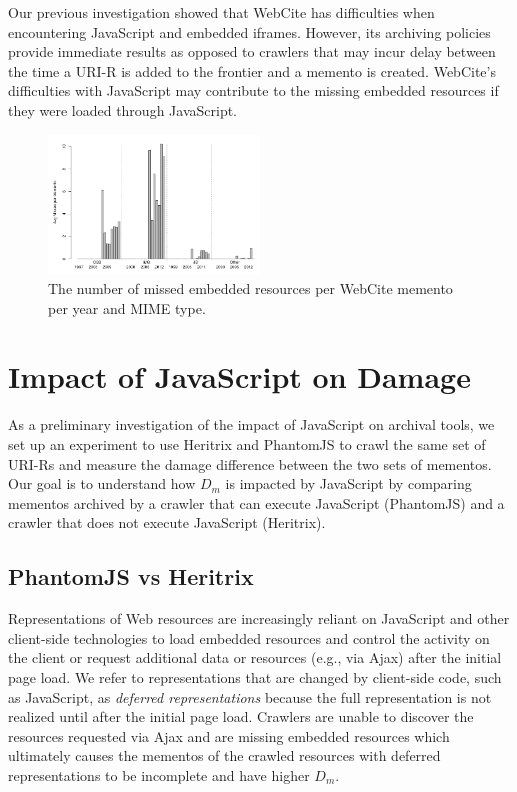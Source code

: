 Our previous investigation \cite{ijdl} showed that WebCite has difficulties when encountering JavaScript and embedded iframes. However, its archiving policies provide immediate results as opposed to crawlers that may incur delay between the time a URI-R is added to the frontier and a memento is created. WebCite's difficulties with JavaScript may contribute to the missing embedded resources if they were loaded through JavaScript.


\begin{figure}[h!]
\includegraphics[width=0.5\textwidth]{./imgs/FileTypes_webcite.png}
\caption{The number of missed embedded resources per WebCite memento per year and MIME type.
}
\label{occstatsWC}
\end{figure}


\section{Impact of JavaScript on Damage}
\label{wcjs}


As a preliminary investigation of the impact of JavaScript on archival tools, we set up an experiment to use Heritrix and PhantomJS to crawl the same set of URI-Rs and measure the damage difference between the two sets of mementos. Our goal is to understand how $D_m$ is impacted by JavaScript by comparing mementos archived by a crawler that can execute JavaScript (PhantomJS) and a crawler that does not execute JavaScript (Heritrix).

\subsection{PhantomJS vs Heritrix}
\label{pjsvhtrix}
Representations of Web resources are increasingly reliant on JavaScript and other client-side technologies to load embedded resources and control the activity on the client or request additional data or resources (e.g., via Ajax) after the initial page load. We refer to representations that are changed by client-side code, such as JavaScript, as \emph{deferred representations} because the full representation is not realized until after the initial page load. 
Crawlers are unable to discover the resources requested via Ajax and are missing embedded resources which ultimately causes the mementos of the crawled resources with deferred representations to be incomplete and have higher $D_m$. 

